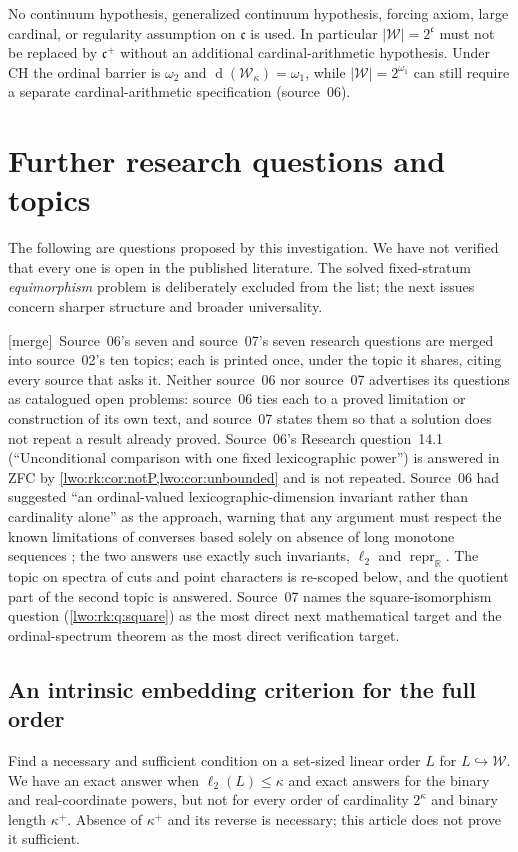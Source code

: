 \documentclass[11pt,a4paper]{article}
\theoremstyle{definition}
\theoremstyle{remark}
\newcommand{\R}{\mathbb R}
\newcommand{\W}{\mathcal W}
\newcommand{\dens}{\operatorname{d}}
\newcommand{\bl}{\ell_2}
\newcommand{\emb}{\hookrightarrow}
\newcommand{\repr}{\operatorname{repr}_{\R}}
\newcommand{\con}{\mathfrak c}
\newcommand{\merge}{\textsf{[merge]}}
\begin{document}
No continuum hypothesis, generalized continuum hypothesis, forcing axiom, large
cardinal, or regularity assumption on $\con$ is used. In particular
$|\W|=2^\con$ must not be replaced by $\con^+$ without an additional
cardinal-arithmetic hypothesis. Under CH the ordinal barrier is $\omega_2$ and
$\dens(\W_\kappa)=\omega_1$, while $|\W|=2^{\omega_1}$ can still require a
separate cardinal-arithmetic specification (source~06).

\section{Further research questions and topics}\label{lwo:sec:research}

The following are questions proposed by this investigation. We have not
verified that every one is open in the published literature. The solved
fixed-stratum \emph{equimorphism} problem is deliberately excluded from the
list; the next issues concern sharper structure and broader universality.

\merge\ Source~06's seven and source~07's seven research questions are merged
into source~02's ten topics; each is printed once, under the topic it shares,
citing every source that asks it. Neither source~06 nor source~07 advertises
its questions as catalogued open problems: source~06 ties each to a proved
limitation or construction of its own text, and source~07 states them so that
a solution does not repeat a result already proved. Source~06's Research
question~14.1 (``Unconditional comparison with one fixed lexicographic
power'') is answered in ZFC by \cref{lwo:rk:cor:notP,lwo:cor:unbounded} and is
not repeated. Source~06 had suggested ``an ordinal-valued
lexicographic-dimension invariant rather than cardinality alone'' as the
approach, warning that any argument must respect the known limitations of
converses based solely on absence of long monotone sequences
\cite{Ramakrishnan}; the two answers use exactly such invariants, $\bl$ and
$\repr$. The topic on spectra of cuts and point characters is re-scoped
below, and the quotient part of the second topic is answered. Source~07 names
the square-isomorphism question (\cref{lwo:rk:q:square}) as the most direct
next mathematical target and the ordinal-spectrum theorem as the most direct
verification target.

\subsection{An intrinsic embedding criterion for the full order}
Find a necessary and sufficient condition on a set-sized linear order $L$
for $L\emb\W$. We have an exact answer when $\bl(L)\leq\kappa$ and
exact answers for the binary and real-coordinate powers, but not for every
order of cardinality $2^\kappa$ and binary length $\kappa^+$.
Absence of $\kappa^+$ and its reverse is necessary; this article does not
prove it sufficient.
\end{document}
